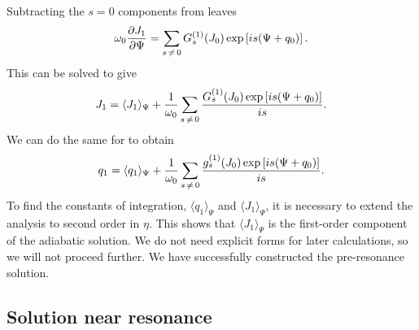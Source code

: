 Subtracting the $s = 0$ components from  leaves
\begin{equation}
\omega_0\dfrac{\partial {J_1}}{\partial {\Psi}} = \sum_{s\,\neq\,0} G_s^{(1)}(J_0)\exp\left[is(\Psi + q_0)\right].
\end{equation}
This can be solved to give
\begin{equation}
J_1 = \langle J_1\rangle_\Psi + \frac{1}{\omega_0}\sum_{s\,\neq\,0} \dfrac{G_s^{(1)}(J_0)\exp\left[is(\Psi + q_0)\right]}{is}.
\label{eq:J-1-sol}
\end{equation}
We can do the same for  to obtain
\begin{equation}
q_1 = \langle q_1\rangle_\Psi + \frac{1}{\omega_0}\sum_{s\,\neq\,0} \dfrac{g_s^{(1)}(J_0)\exp\left[is(\Psi + q_0)\right]}{is}.
\label{eq:q-1-sol}
\end{equation}
To find the constants of integration, $\langle q_1\rangle_\Psi$ and $\langle J_1\rangle_\Psi$, it is necessary to extend the analysis to second order in $\eta$. This shows that $\langle J_1\rangle_\Psi$ is the first-order component of the adiabatic solution. We do not need explicit forms for later calculations, so we will not proceed further. We have successfully constructed the pre-resonance solution.

\subsection{Solution near resonance}\label{sec:interior-res}

